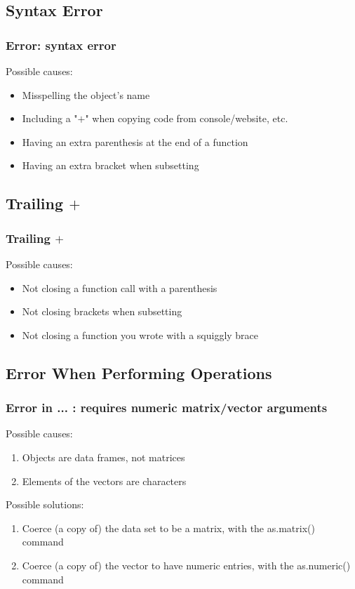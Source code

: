 \subsection{Syntax Error}
\begin{frame}[fragile]
  \frametitle{\ttfamily Error: syntax error \normalfont}
Possible causes:
  \begin{itemize}
    \item Misspelling the object's name
    \item Including a "$+$" when copying code from console/website, etc.
    \item Having an extra parenthesis at the end of a function
    \item Having an extra bracket when subsetting
  \end{itemize}
\end{frame}

\subsection{Trailing $+$}
\begin{frame}[fragile]
  \frametitle{Trailing $+$}
Possible causes:
  \begin{itemize}
    \item Not closing a function call with a parenthesis
    \item Not closing brackets when subsetting
    \item Not closing a function you wrote with a squiggly brace
  \end{itemize}
\end{frame}

\subsection{Error When Performing Operations}
\begin{frame}[fragile]
  \frametitle{\ttfamily Error in ... : requires numeric matrix/vector arguments \normalfont}
Possible causes:
  \begin{enumerate}
    \item Objects are data frames, not matrices
    \item Elements of the vectors are characters \\
  \end{enumerate}
  
Possible solutions:
  \begin{enumerate}
    \item Coerce (a copy of) the data set to be a matrix, with the \ttfamily as.matrix() \normalfont command
    \item Coerce (a copy of) the vector to have numeric entries, with the \ttfamily as.numeric() \normalfont command
  \end{enumerate} 
\end{frame}

